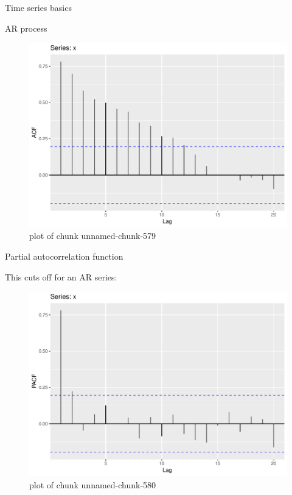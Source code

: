 \documentclass[ignorenonframetext,]{beamer}
\newenvironment{Shaded}{\begin{snugshade}}{\end{snugshade}}
\newcommand{\DataTypeTok}[1]{\textcolor[rgb]{0.13,0.29,0.53}{#1}}
\newcommand{\KeywordTok}[1]{\textcolor[rgb]{0.13,0.29,0.53}{\textbf{#1}}}
\newcommand{\NormalTok}[1]{#1}
\newcommand{\OperatorTok}[1]{\textcolor[rgb]{0.81,0.36,0.00}{\textbf{#1}}}
\newcommand{\StringTok}[1]{\textcolor[rgb]{0.31,0.60,0.02}{#1}}
\begin{document}
\begin{frame}[fragile]{Time series basics}
\begin{block}{AR process}
\begin{figure}
\centering
\includegraphics{figure/unnamed-chunk-579-1.pdf}
\caption{plot of chunk unnamed-chunk-579}
\end{figure}

\end{block}

\begin{block}{Partial autocorrelation function}

This cuts off for an AR series:

\begin{Shaded}
\end{Shaded}

\begin{figure}
\centering
\includegraphics{figure/unnamed-chunk-580-1.pdf}
\caption{plot of chunk unnamed-chunk-580}
\end{figure}


\end{block}
\end{frame}
\end{document}
